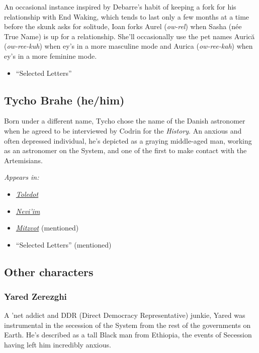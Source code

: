 An occasional instance inspired by Debarre's habit of keeping a fork for his relationship with End Waking, which tends to last only a few months at a time before the skunk asks for solitude, Ioan forks Aurel (\emph{ow-rel}) when {Sasha (née True Name) is up for a relationship. She'll occasionally use the pet names Aurică (\emph{ow-ree-kuh}) when ey's in a more masculine mode and Aurica (\emph{ow-ree-kah}) when ey's in a more feminine mode.}

\begin{itemize}
\tightlist
\item
  ``Selected Letters''
\end{itemize}

\subsection{Tycho Brahe (he/him)}

Born under a different name, Tycho chose the name of the Danish astronomer when he agreed to be interviewed by Codrin for the \emph{History}. An anxious and often depressed individual, he's depicted as a graying middle-aged man, working as an astronomer on the System, and one of the first to make contact with the Artemisians.

\emph{Appears in:}

\begin{itemize}
\tightlist
\item
  \href{https://toledot.post-self.ink}{\emph{Toledot}}
\item
  \href{https://neviim.post-self.ink}{\emph{Nevi'im}}
\item
  \href{https://mitzvot.post-self.ink}{\emph{Mitzvot}} (mentioned)
\item
  ``Selected Letters'' (mentioned)
\end{itemize}

\subsection{Other characters}

\subsubsection{Yared Zerezghi}

A 'net addict and DDR (Direct Democracy Representative) junkie, Yared was instrumental in the secession of the System from the rest of the governments on Earth. He's described as a tall Black man from Ethiopia, the events of Secession having left him incredibly anxious.



